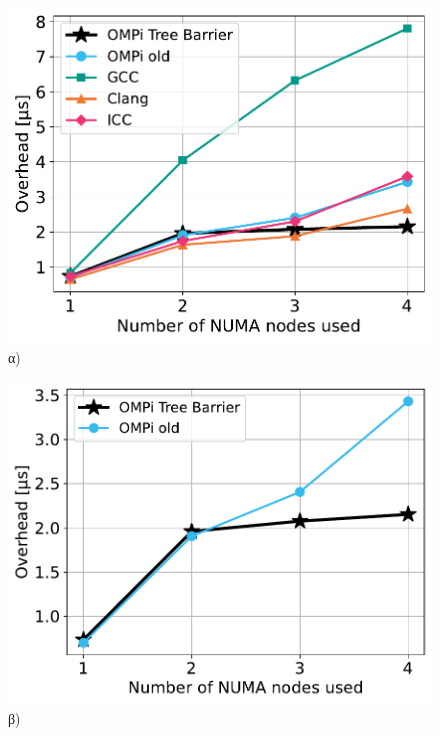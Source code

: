 \begin{figure}[htbp]
    \centering
    \begin{minipage}{0.5\textwidth}
        \centering
        \includegraphics[width=1\textwidth]{Figures/parade-epcc/topothreads_tpn-8_spread.pdf}
		α)
    \end{minipage}\hfill
     \begin{minipage}{0.5\textwidth}
        \centering
        \includegraphics[width=1\textwidth]{Figures/parade-epcc/ompionly_topothreads_tpn-8_spread.pdf}
		β)
    \end{minipage}
    \newline
    \begin{minipage}{0.5\textwidth}

\end{minipage}
\end{figure}
